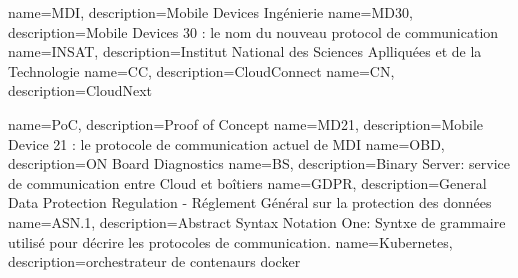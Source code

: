  {
	name=MDI,
	description={Mobile Devices Ingénierie}
}
 {
	name=MD30,
	description={Mobile Devices 30 : le nom du nouveau protocol de communication }
}
 {
	name=INSAT,
	description={Institut National des Sciences Aplliquées et de la Technologie}
}
 {
	name=CC,
	description={CloudConnect}
}
 {
	name=CN,
	description={CloudNext}
}

 {
	name=PoC,
	description={Proof of Concept}
}
 {
	name=MD21,
	description={Mobile Device 21 : le protocole de communication actuel de MDI}
}
 {
	name=OBD,
	description={ON Board Diagnostics}
}
 {
	name=BS,
	description={Binary Server: service de communication entre Cloud et boîtiers}
}
 {
	name=GDPR,
	description={General Data Protection Regulation - Réglement Général sur la protection des données\cite{gdpr} }
}
 {
	name=ASN.1,
	description={Abstract Syntax Notation One: Syntxe de grammaire utilisé pour décrire les protocoles de communication.}
}
 {
	name=Kubernetes,
	description={orchestrateur de contenaurs docker}
}